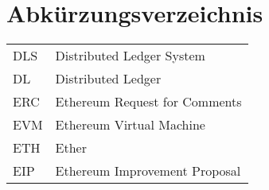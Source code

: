
\section{Abkürzungsverzeichnis}

\begin{longtable}{p{6 cm}p{9 cm}}
    DLS & Distributed Ledger System \\
    DL & Distributed Ledger \\
    ERC & Ethereum Request for Comments \\
    EVM & Ethereum Virtual Machine \\
    ETH & Ether \\
    EIP & Ethereum Improvement Proposal \\
\end{longtable}

   